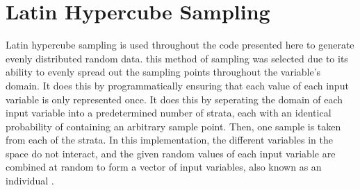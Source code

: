 \section{Latin Hypercube Sampling}
\label{sec:lhs}

Latin hypercube sampling is used throughout the code presented here to generate evenly distributed random data. this method of sampling was selected due to its ability to evenly spread out the sampling points throughout the variable's domain. It does this by programmatically ensuring that each value of each input variable is only represented once. It does this by seperating the domain of each input variable into a predetermined number of strata, each with an identical probability of containing an arbitrary sample point. Then, one sample is taken from each of the strata. In this implementation, the different variables in the space do not interact, and the given random values of each input variable are combined at random to form a vector of input variables, also known as an individual \cite{lhs}.  
